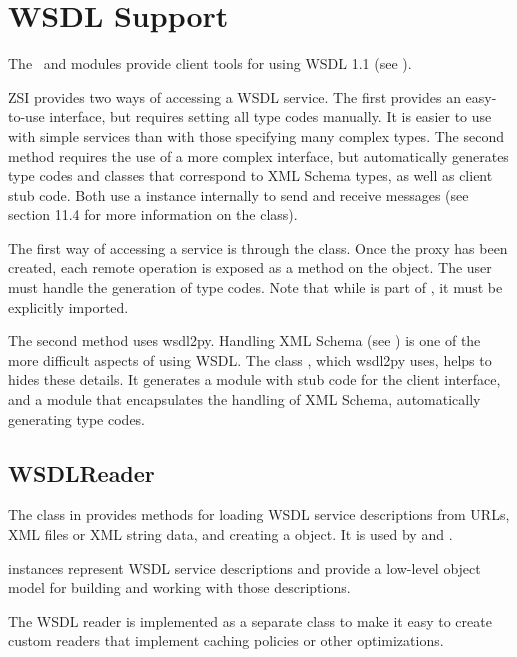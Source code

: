 \chapter{WSDL Support}

The \ZSI~and  modules provide client tools for
using WSDL 1.1
(see ).

ZSI provides two ways of accessing a WSDL service.  The first
provides an easy-to-use interface,
but requires setting all type codes manually.  It is easier
to use with simple services than with those specifying many
complex types.
The second method requires the use of a more complex
interface, but automatically generates type codes and classes
that correspond to XML Schema types, as well as client stub code.
Both use a  instance internally to send and receive
messages (see section 11.4 for more information on the 
class).

The first way of accessing a service is through the  class.
Once the proxy has been created, each remote operation is exposed
as a method on the object.
The user must handle the generation of type codes.
Note that while  is part of \ZSI{}, it must be
explicitly imported.

The second method uses wsdl2py.  Handling XML Schema
(see ) 
is one of the more difficult aspects
of using WSDL.  The class , which wsdl2py
uses, helps to hides these
details.  It generates a module with stub code for the client interface,
and a module that encapsulates the handling of XML Schema, automatically
generating type codes.

\section{WSDLReader}

The  class in  provides
methods for loading WSDL service descriptions from URLs, XML files
or XML string data, and creating a  object.
It is used by  and .

 instances represent WSDL service descriptions and provide 
a low-level object model for building and working with those descriptions.

The WSDL reader is implemented as a 
separate class to make it easy to create custom readers that implement 
caching policies or other optimizations.



